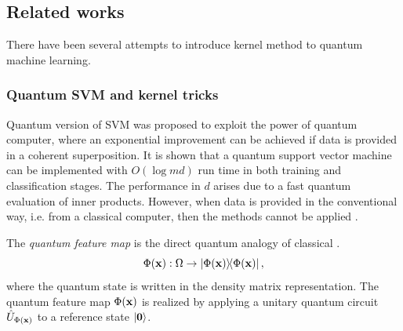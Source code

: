 \subsection{Related works}\label{sec:qke}
There have been several attempts to introduce kernel method to quantum machine learning.

\subsubsection{Quantum SVM and kernel tricks}
Quantum version of SVM was proposed \cite{rebentrostQuantumSupportVector2014} to exploit the power of quantum computer, where an exponential improvement can be achieved if data is provided in a coherent superposition. 
It is shown that a quantum support vector machine can be implemented with $O(\log md)$ run time in both training and classiﬁcation stages. 
The performance in $d$ arises due to a fast quantum evaluation of inner products.
However, when data is provided in the conventional way, i.e. from a classical computer, then the methods cannot be applied \cite{tangQuantuminspiredClassicalAlgorithm2019}.
\begin{definition}\label{def:quantum_feature_map}
	The \emph{quantum feature map} is the direct quantum analogy of classical .
	\begin{equation}
		\Phi(\vbx): \Omega \to \dyad{\Phi(\vbx)},
		\label{eq:quantum_feature_map}
	\end{equation}
	where the quantum state is written in the density matrix representation.
	The quantum feature map $\Phi(\vb{x})$ is realized by applying a unitary quantum circuit $\hat{U}_{\Phi(\vb{x})}$ to a reference state $\ket{\vb{0}}$.
\end{definition}

